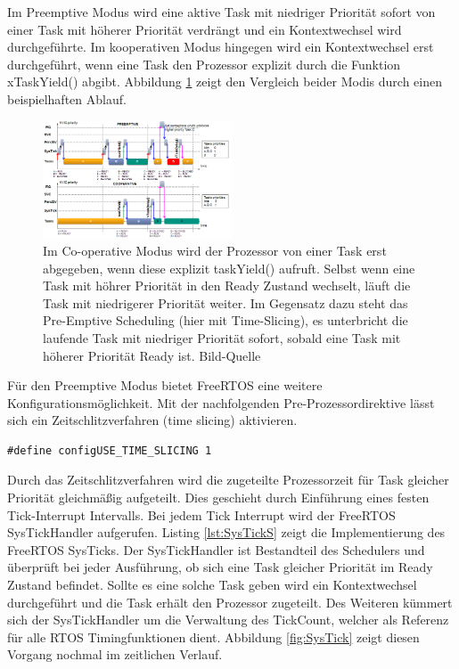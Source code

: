 Im Preemptive Modus wird eine aktive Task mit niedriger Priorität sofort von einer Task mit höherer Priorität verdrängt und ein Kontextwechsel wird durchgeführte. Im kooperativen Modus hingegen wird ein Kontextwechsel erst durchgeführt, wenn eine Task den Prozessor explizit durch die Funktion xTaskYield() abgibt. Abbildung \ref{fig:PreVSCo} zeigt den Vergleich beider Modis durch einen beispielhaften Ablauf. 
\begin{figure}[htb]
	\centering
		\includegraphics[width=0.5\textwidth]{Pictures/EMCUIT/PreemptiveCooperative.png}
	\caption{Im Co-operative Modus wird der Prozessor von einer Task erst abgegeben, wenn diese explizit taskYield() aufruft. Selbst wenn eine Task mit höhrer Priorität in den Ready Zustand wechselt, läuft die Task mit niedrigerer Priorität weiter. Im Gegensatz dazu steht das Pre-Emptive Scheduling (hier mit Time-Slicing), es unterbricht die laufende Task mit niedriger Priorität sofort, sobald eine Task mit höherer Priorität Ready ist. Bild-Quelle~\protect{}}
	\label{fig:PreVSCo}
\end{figure}
Für den Preemptive Modus bietet FreeRTOS eine weitere Konfigurationsmöglichkeit. Mit der nachfolgenden Pre-Prozessordirektive lässt sich ein Zeitschlitzverfahren (time slicing) aktivieren. 
\begin{lstlisting}[numbers = none]
#define configUSE_TIME_SLICING 1
\end{lstlisting}
Durch das Zeitschlitzverfahren wird die zugeteilte Prozessorzeit für Task gleicher Priorität gleichmäßig aufgeteilt. Dies geschieht durch Ein\-füh\-rung eines festen Tick-Interrupt Intervalls. Bei jedem Tick Interrupt wird der FreeRTOS SysTickHandler aufgerufen. Listing \ref{lst:SysTickS} zeigt die Implementierung des FreeRTOS SysTicks. Der SysTickHandler ist Bestandteil des Schedulers und überprüft bei jeder Ausführung, ob sich eine Task gleicher Priorität im Ready Zustand befindet. Sollte es eine solche Task geben wird ein Kontextwechsel durchgeführt und die Task erhält den Prozessor zugeteilt. Des Weiteren kümmert sich der SysTickHandler um die Verwaltung des TickCount, welcher als Referenz für alle RTOS Timingfunktionen dient. Abbildung \ref{fig:SysTick} zeigt diesen Vorgang nochmal im zeitlichen Verlauf. 
